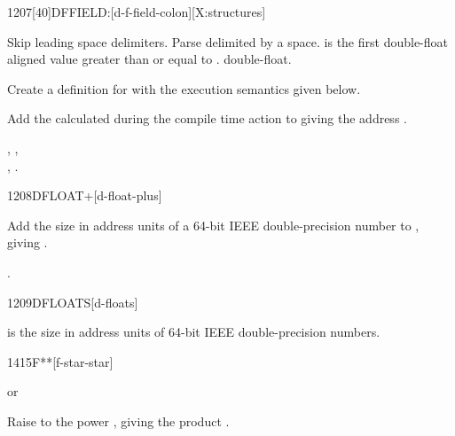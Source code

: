 
\pagebreak
\begin{worddef}{1207}[40]{DFFIELD:}[d-f-field-colon][X:structures]
\item {}

	Skip leading space delimiters. Parse  delimited by
	a space.  is the first double-float aligned value
	greater than or equal to .  
	double-float.

	Create a definition for  with the execution semantics
	given below.

\execute[name]

	Add the  calculated during the compile time action to
	 giving the address .

\see {},
	, \\
	,
	.
\end{worddef}


\begin{worddef}{1208}{DFLOAT+}[d-float-plus]
\item {}

	Add the size in address units of a 64-bit IEEE double-precision
	number to , giving .

\see {}.
\end{worddef}


\begin{worddef}{1209}{DFLOATS}[d-floats]
\item {}

	 is the size in address units of  64-bit
	IEEE double-precision numbers.
\end{worddef}


\begin{worddef}{1415}{F**}[f-star-star]
\item {} or

	Raise  to the power , giving the product
	.
\end{worddef}



